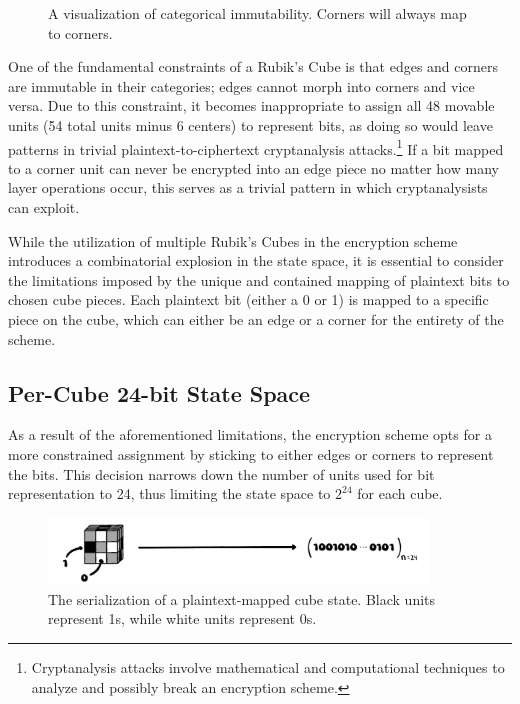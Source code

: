 \documentclass[12pt]{article}
\begin{document}
\begin{figure}[h]
\begin{minipage}[c]{0.2\textwidth}
    \end{minipage}
    \caption{A visualization of categorical immutability. Corners will always map to corners.}
\end{figure}

One of the fundamental constraints of a Rubik's Cube is that edges and corners are immutable in their categories; edges cannot morph into corners and vice versa. Due to this constraint, it becomes inappropriate to assign all 48 movable units (54 total units minus 6 centers) to represent bits, as doing so would leave patterns in trivial plaintext-to-ciphertext cryptanalysis attacks.\footnote{Cryptanalysis attacks involve mathematical and computational techniques to analyze and possibly break an encryption scheme.} If a bit mapped to a corner unit can never be encrypted into an edge piece no matter how many layer operations occur, this serves as a trivial pattern in which cryptanalysists can exploit.

While the utilization of multiple Rubik's Cubes in the encryption scheme introduces a combinatorial explosion in the state space, it is essential to consider the limitations imposed by the unique and contained mapping of plaintext bits to chosen cube pieces. Each plaintext bit (either a 0 or 1) is mapped to a specific piece on the cube, which can either be an edge or a corner for the entirety of the scheme.

\subsection{Per-Cube 24-bit State Space}
As a result of the aforementioned limitations, the encryption scheme opts for a more constrained assignment by sticking to either edges or corners to represent the bits. This decision narrows down the number of units used for bit representation to 24, thus limiting the state space to \(2^{24}\) for each cube.

\vspace{0.5cm}

\begin{figure}[H]
    \centering
    \includegraphics[width=0.9\textwidth]{encryption/bitted-transform.jpg}
    \caption{The serialization of a plaintext-mapped cube state. Black units represent 1s, while white units represent 0s.}
\end{figure}
\end{document}

